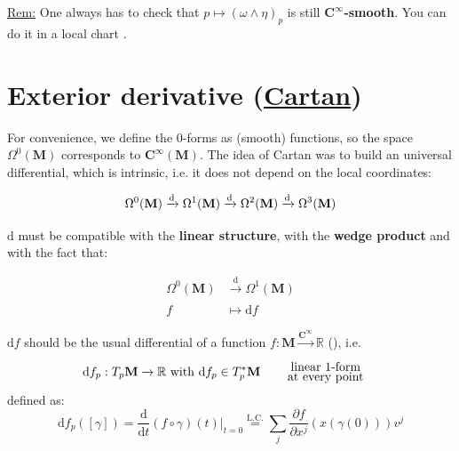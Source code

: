\documentclass[../main.tex]{subfiles}
\begin{document}
\underline{Rem:} One always has to check that $p\mapsto(\omega\wedge\eta)_p$ is still $\mathbf{C}^{\infty}$\textbf{-smooth}. You can do it in a local chart .

\section{Exterior derivative (\href{https://it.wikipedia.org/wiki/\%C3\%89lie_Joseph_Cartan}{Cartan})}
For convenience, we define the 0-forms as (smooth) functions, so the space $\Omega^0(\mathbf{M})$ corresponds to $\mathbf{C}^{\infty}(\mathbf{M})$. The idea of Cartan was to build an universal differential, which is intrinsic, i.e. it does not depend on the local coordinates:

\[
\Omega^0(\mathbf{M})\xrightarrow[]{\textrm{d}}\Omega^1(\mathbf{M})\xrightarrow[]{\textrm{\textrm{d}}}\Omega^2(\mathbf{M})\xrightarrow[]{\textrm{d}}\Omega^3(\mathbf{M})
\]

$\textrm{d}$ must be compatible with the \textbf{linear structure}, with the \textbf{wedge product} and with the fact that:

\[
\begin{split}
\Omega^0(\mathbf{M}) & \xrightarrow[]{\textrm{d}} \Omega^1(\mathbf{M})\\
f &\mapsto \textrm{d}f
\end{split}
\]

$\textrm{d}f$ should be the usual differential of a function $f:\mathbf{M}\xrightarrow[]{\mathbf{C}^{\infty}}\mathbb{R}$ (), i.e.
\[
\textrm{d}f_p: T_p\mathbf{M}\xrightarrow[]{}\mathbb{R} \ \textrm{with} \ \textrm{d}f_p\in T_p^*\mathbf{M} \quad  \text{\parbox{3 cm}{\centering linear 1-form \\[-4pt]  at every point}}
\]
defined as:
\[
\textrm{d}f_p([\gamma])=\frac{\textrm{d}}{\textrm{d}t}(f\circ\gamma)(t)\big|_{t=0}\overset{\textrm{L.C.}}{=}\sum_j\frac{\partial f}{\partial x^j}\left(x(\gamma(0))\right)v^j
\]
\end{document}
